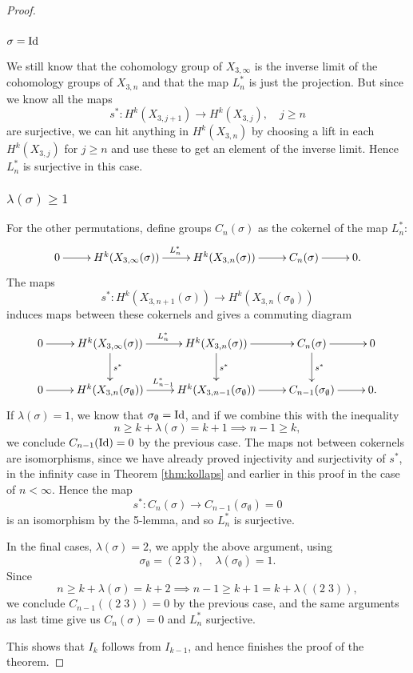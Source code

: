 \begin{proof}
  \subsubsection{$\sigma = \operatorname{Id}$}
  
  We still know that the cohomology group of $X_{3,\infty}$ is the
  inverse limit of the
  cohomology groups of $X_{3,n}$ and that the map $L_n^*$ is just the
  projection. But since we know all the maps 
  \[s^* : H^k(X_{3,j+1})\to H^k(X_{3,j}), \quad j \geq n \] are
  surjective, we can hit anything in $H^k(X_{3,n})$ by choosing a lift
  in each $H^k(X_{3,j})$ for $j \geq n$ and use these to get an element
  of the inverse limit. Hence $L_n^*$ is surjective in this case.
  
  \subsubsection{$\lambda(\sigma) \geq 1$}
  
  For the other permutations, define groups $C_n(\sigma)$ as the
  cokernel of the map $L_n^*$:
  \[ \xymatrix{ 0 \ar[r] & H^k(X_{3,\infty}(\sigma))
    \ar[r]^{L_{n}^*} &
    H^k(X_{3,n}(\sigma)) \ar[r] &
    C_{n}(\sigma) \ar[r] &  0.} \]
  The maps
  \[s^* : H^k(X_{3,n+1}(\sigma)) \to H^k(X_{3,n}(\sigma_{\emptyset})) \]
  induces maps between these cokernels and gives a commuting diagram
  \[ \xymatrix{ 0 \ar[r] & H^k(X_{3,\infty}(\sigma))
    \ar[r]^{L_{n}^*}\ar[d]^{s^*} &
    H^k(X_{3,n}(\sigma)) \ar[r]\ar[d]^{s^*} &
    C_{n}(\sigma) \ar[r]\ar[d]^{s^*} &  0 \\
    0 \ar[r] & H^k(X_{3,n}(\sigma_{\emptyset})) \ar[r]^{L_{n-1}^*} &
    H^k(X_{3,n-1}(\sigma_{\emptyset})) \ar[r] &
    C_{n-1}(\sigma_{\emptyset}) \ar[r] &  0. } \]
  If $\lambda(\sigma) = 1$, we know that $\sigma_{\emptyset} = \operatorname{Id}$, and
  if we combine this with the inequality
  \[ n \geq k+\lambda(\sigma) = k+1 \implies n-1 \geq k, \]
  we conclude $C_{n-1}(\operatorname{Id}) = 0$ by the previous case. The
  maps not between cokernels are isomorphisms, since we have already
  proved
  injectivity and surjectivity of $s^*$, in the infinity case in
  Theorem \ref{thm:kollaps} and earlier in this proof in the case of $n
  < \infty$. Hence the map 
  \[ s^* : C_{n}(\sigma) \to C_{n-1}(\sigma_{\emptyset}) = 0 \]
  is an isomorphism by the 5-lemma, and so $L_n^*$ is surjective.
  
  In the final cases, $\lambda(\sigma) = 2$, we apply the above
  argument, using
  \[ \sigma_{\emptyset} = (2\; 3),\quad \lambda(\sigma_{\emptyset}) =
  1. \]
  Since
  \[ n \geq k+\lambda(\sigma) = k +2 \implies n-1 \geq k+1 = k +
  \lambda((2\;3)), \]
  we conclude $C_{n-1}((2\;3))=0$ by the previous case, and the same
  arguments as last time give us $C_{n}(\sigma) = 0$ and $L^*_n$
  surjective.
  
  This shows that $I_k$ follows from $I_{k-1}$, and hence finishes the
  proof of the theorem.
\end{proof}

